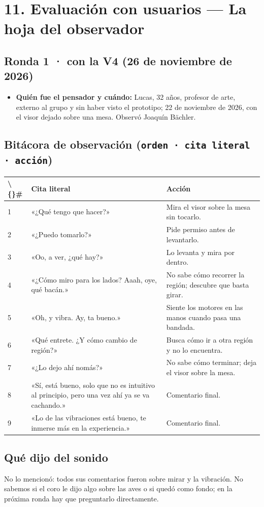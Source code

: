 \documentclass[11pt,a4paper]{article}
\begin{document}
\section*{11. Evaluación con usuarios --- La hoja del observador}
\subsection*{Ronda 1 · con la V4 (26 de noviembre de 2026)}
\begin{itemize}
\item \textbf{Quién fue el pensador y cuándo:} Lucas, 32 años, profesor de arte, externo al grupo y sin haber visto el prototipo; 22 de noviembre de 2026, con el visor dejado sobre una mesa. Observó Joaquín Bächler.
\end{itemize}
\subsection*{Bitácora de observación (\texttt{orden · cita literal · acción})}
{\small\begin{longtable}{@{}p{6mm}p{86mm}p{62mm}@{}}\toprule
\textbf{\textbackslash\{\}\#} & \textbf{Cita literal} & \textbf{Acción}\\\midrule
1 & «¿Qué tengo que hacer?» & Mira el visor sobre la mesa sin tocarlo.\\
2 & «¿Puedo tomarlo?» & Pide permiso antes de levantarlo.\\
3 & «Oo, a ver, ¿qué hay?» & Lo levanta y mira por dentro.\\
4 & «¿Cómo miro para los lados? Aaah, oye, qué bacán.» & No sabe cómo recorrer la región; descubre que basta girar.\\
5 & «Oh, y vibra. Ay, ta bueno.» & Siente los motores en las manos cuando pasa una bandada.\\
6 & «Qué entrete. ¿Y cómo cambio de región?» & Busca cómo ir a otra región y no lo encuentra.\\
7 & «¿Lo dejo ahí nomás?» & No sabe cómo terminar; deja el visor sobre la mesa.\\
8 & «Sí, está bueno, solo que no es intuitivo al principio, pero una vez ahí ya se va cachando.» & Comentario final.\\
9 & «Lo de las vibraciones está bueno, te inmerse más en la experiencia.» & Comentario final.\\
\bottomrule\end{longtable}}
\subsection*{Qué dijo del sonido}
No lo mencionó: todos sus comentarios fueron sobre mirar y la vibración. No sabemos si el coro le dijo algo sobre las aves o si quedó como fondo; en la próxima ronda hay que preguntarlo directamente.
\end{document}
